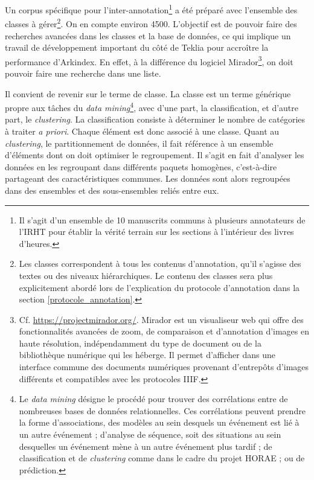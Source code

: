 \documentclass[a4paper,12pt,twoside]{book}
\begin{document}
	Un corpus spécifique pour l'inter-annotation\footnote{Il s'agit d'un ensemble de 10 manuscrits communs à plusieurs annotateurs de l'IRHT pour établir la vérité terrain sur les sections à l'intérieur des livres d'heures.} a été préparé avec l’ensemble des classes à gérer\footnote{Les classes correspondent à tous les contenus d'annotation, qu’il s’agisse des textes ou des niveaux hiérarchiques. Le contenu des classes sera plus explicitement abordé lors de l'explication du protocole d'annotation dans la section \ref{protocole_annotation}.}. On en compte environ 4500. L’objectif est de pouvoir faire des recherches avancées dans les classes et la base de données, ce qui implique un travail de développement important du côté de Teklia pour accroître la performance d'Arkindex. En effet, à la différence du logiciel Mirador\footnote{Cf. \url{https://projectmirador.org/}. Mirador est un visualiseur web qui offre des fonctionnalités avancées de zoom, de comparaison et d'annotation d’images en haute résolution, indépendamment du type de document ou de la bibliothèque numérique qui les héberge. Il permet d'afficher dans une interface commune des documents numériques provenant d'entrepôts d'images différents et compatibles avec les protocoles IIIF.}, on doit pouvoir faire une recherche dans une liste. 
	
Il convient de revenir sur le terme de \og classe\fg{}. La classe est un terme générique propre aux tâches du \textit{data mining}\footnote{Le \textit{data mining} désigne le procédé pour trouver des corrélations entre de nombreuses bases de données relationnelles. Ces corrélations peuvent prendre la forme d'associations, des modèles au sein desquels un événement est lié à un autre événement ; d'analyse de séquence, soit des situations au sein desquelles un événement mène à un autre événement plus tardif ; de classification et de \textit{clustering} comme dans le cadre du projet HORAE ; ou de prédiction.}, avec d’une part, la classification, et d’autre part, le \textit{clustering}. La classification consiste à déterminer le nombre de catégories à traiter \textit{a priori}. Chaque élément est donc associé à une classe. Quant au \textit{clustering}, le partitionnement de données, il fait référence à un ensemble d’éléments dont on doit optimiser le regroupement. Il s'agit en fait d'analyser les données en les regroupant dans différents paquets homogènes, c'est-à-dire partageant des caractéristiques communes. Les données sont alors regroupées dans des ensembles et des sous-ensembles reliés entre eux.\\
\end{document}
